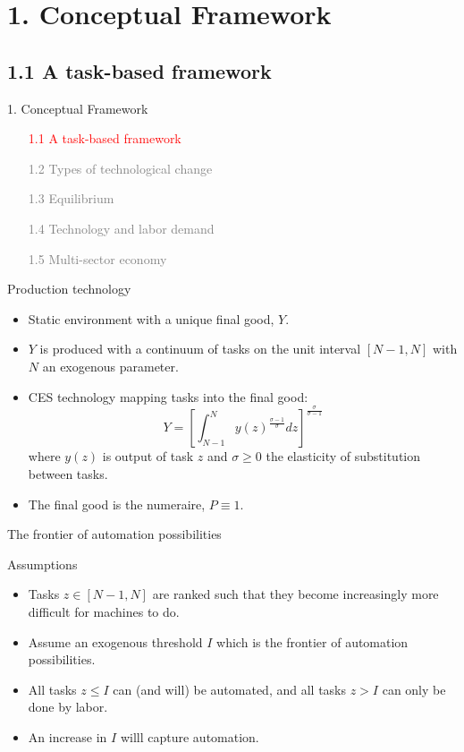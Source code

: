 \documentclass[notes=show]{beamer}
\begin{document}
\section{1. Conceptual Framework}

\subsection{1.1 A task-based framework}

\begin{frame}{1. Conceptual Framework}
\begin{itemize}
\item[\textcolor{red}{1.1}] \textcolor{red}{A task-based framework} \bigskip
\item[\textcolor{gray}{1.2}] \textcolor{gray}{Types of technological change} \bigskip
\item[\textcolor{gray}{1.3}] \textcolor{gray}{Equilibrium} \bigskip
\item[\textcolor{gray}{1.4}] \textcolor{gray}{Technology and labor demand} \bigskip
\item[\textcolor{gray}{1.5}] \textcolor{gray}{Multi-sector economy} 
\end{itemize}
\end{frame}

\begin{frame}{Production technology}
\begin{itemize}
\item Static environment with a unique final good, $Y$. \medskip
\item $Y$ is produced with a continuum of tasks on the unit interval $[N-1,N]$ with $N$ an exogenous parameter. \medskip
\item CES technology mapping tasks into the final good:
\[
Y= \left[ \int_{N-1}^{N} y(z)^{\frac{\sigma-1}{\sigma}}dz \right]^{\frac{\sigma}{\sigma-1}} \tag{A1}  \label{eqA1}
\]
where $y(z)$ is output of task $z$ and $\sigma \geq 0 $ the elasticity of substitution between tasks. \medskip
\item The final good is the numeraire, $P \equiv 1$.
\end{itemize}
\end{frame}

\begin{frame}{The frontier of automation possibilities}
\begin{block}{Assumptions}
\begin{itemize}
\item Tasks $z \in [N-1,N]$ are ranked such that they become increasingly more difficult for machines to do. \medskip
\item Assume an exogenous threshold $I$ which is the frontier of automation possibilities. \medskip
\item All tasks $z \leq I$ can (and will) be automated, and all tasks $z > I $ can only be done by labor. \medskip
\item An increase in $I$ willl capture automation. 
\end{itemize}
\end{block}
\end{frame}
\end{document}
